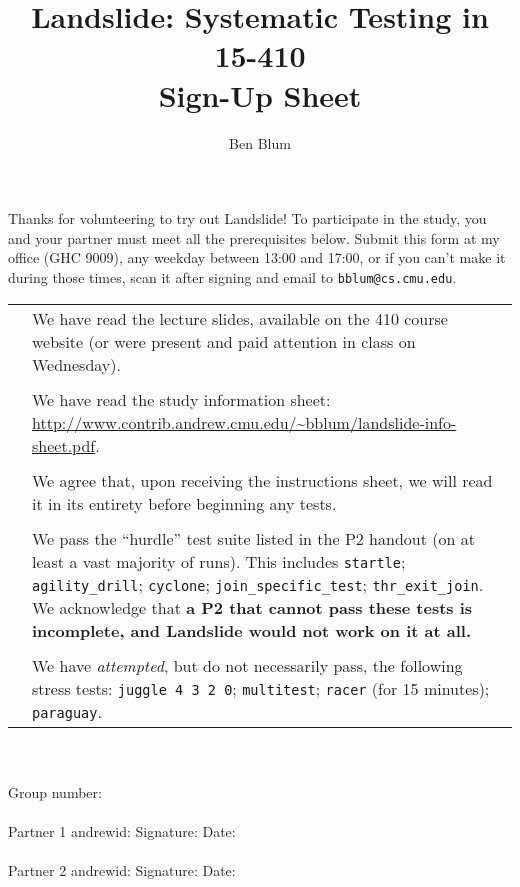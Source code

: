 \documentclass{article}
\begin{document}

\newcommand\checkbox[1]{\huge \Square & #1 \\}

\title{\bf Landslide: Systematic Testing in 15-410 \\ Sign-Up Sheet}
\author{Ben Blum}
\date{}
\maketitle

Thanks for volunteering to try out Landslide! To participate in the study, you and your partner must meet all the prerequisites below. Submit this form at my office (GHC 9009), any weekday between 13:00 and 17:00, or if you can't make it during those times, scan it after signing and email to {\tt bblum@cs.cmu.edu}.
\\

\begin{tabular}{lp{5.5in}}
	\checkbox{We have read the lecture slides, available on the 410 course website (or were present and paid attention in class on Wednesday).}

	\\
	\checkbox{We have read the study information sheet: \url{http://www.contrib.andrew.cmu.edu/~bblum/landslide-info-sheet.pdf}.}

	\\
	\checkbox{We agree that, upon receiving the instructions sheet, we will read it in its entirety before beginning any tests.}

	\\
	\checkbox{We pass the ``hurdle'' test suite listed in the P2 handout (on at least a vast majority of runs). This includes {\tt startle}; {\tt agility\_drill}; {\tt cyclone}; {\tt join\_specific\_test}; {\tt thr\_exit\_join}. We acknowledge that {\bf a P2 that cannot pass these tests is incomplete, and Landslide would not work on it at all.}}

	\\
	\checkbox{We have {\em attempted}, but do not necessarily pass, the following stress tests: {\tt juggle 4 3 2 0}; {\tt multitest}; {\tt racer} (for 15 minutes); {\tt paraguay}.}


\end{tabular}
\\
\vspace{0.5in}
\\
Group number: \underline{\hspace{1.5in}}\\
\vspace{0.5in}\\
Partner 1 andrewid: \underline{\hspace{1.5in}} Signature: \underline{\hspace{1.5in}} Date: \underline{\hspace{1in}}\\
\vspace{0.5in}\\
Partner 2 andrewid: \underline{\hspace{1.5in}} Signature: \underline{\hspace{1.5in}} Date: \underline{\hspace{1in}}
\end{document}
